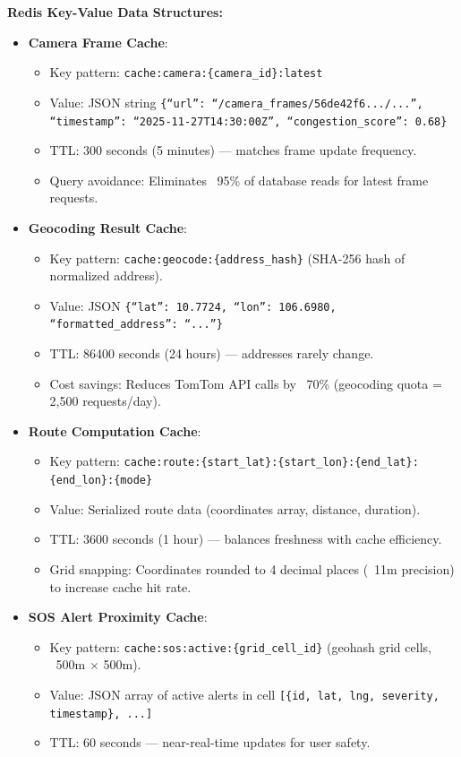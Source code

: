 \textbf{Redis Key-Value Data Structures:}
\begin{itemize}
    \item \textbf{Camera Frame Cache}:
    \begin{itemize}
        \item Key pattern: \texttt{cache:camera:\{camera\_id\}:latest}
        \item Value: JSON string \texttt{\{``url'': ``/camera\_frames/56de42f6.../...'', ``timestamp'': ``2025-11-27T14:30:00Z'', ``congestion\_score'': 0.68\}}
        \item TTL: 300 seconds (5 minutes) — matches frame update frequency.
        \item Query avoidance: Eliminates ~95\% of database reads for latest frame requests.
    \end{itemize}
    
    \item \textbf{Geocoding Result Cache}:
    \begin{itemize}
        \item Key pattern: \texttt{cache:geocode:\{address\_hash\}} (SHA-256 hash of normalized address).
        \item Value: JSON \texttt{\{``lat'': 10.7724, ``lon'': 106.6980, ``formatted\_address'': ``...''\}}
        \item TTL: 86400 seconds (24 hours) — addresses rarely change.
        \item Cost savings: Reduces TomTom API calls by ~70\% (geocoding quota = 2,500 requests/day).
    \end{itemize}
    
    \item \textbf{Route Computation Cache}:
    \begin{itemize}
        \item Key pattern: \texttt{cache:route:\{start\_lat\}:\{start\_lon\}:\{end\_lat\}:\{end\_lon\}:\{mode\}}
        \item Value: Serialized route data (coordinates array, distance, duration).
        \item TTL: 3600 seconds (1 hour) — balances freshness with cache efficiency.
        \item Grid snapping: Coordinates rounded to 4 decimal places (~11m precision) to increase cache hit rate.
    \end{itemize}
    
    \item \textbf{SOS Alert Proximity Cache}:
    \begin{itemize}
        \item Key pattern: \texttt{cache:sos:active:\{grid\_cell\_id\}} (geohash grid cells, ~500m × 500m).
        \item Value: JSON array of active alerts in cell \texttt{[\{id, lat, lng, severity, timestamp\}, ...]}
        \item TTL: 60 seconds — near-real-time updates for user safety.
    \end{itemize}
\end{itemize}

